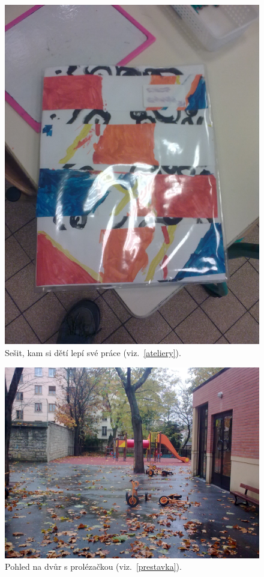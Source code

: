 	\begin{figure}[tb]
		\centering
		\includegraphics[height=0.35\textheight]{./fotky/Obr15.jpg}
		\caption{
			Sešit, kam si dětí lepí své práce (viz.~\ref{ateliery}).
		}
		\label{Obr15}
	\end{figure}

	\begin{figure}[tb]
		\centering
		\includegraphics[height=0.35\textheight]{./fotky/Obr16.jpg}
		\caption{
			Pohled na dvůr s prolézačkou (viz.~\ref{prestavka}).
		}
		\label{Obr16}
	\end{figure}

